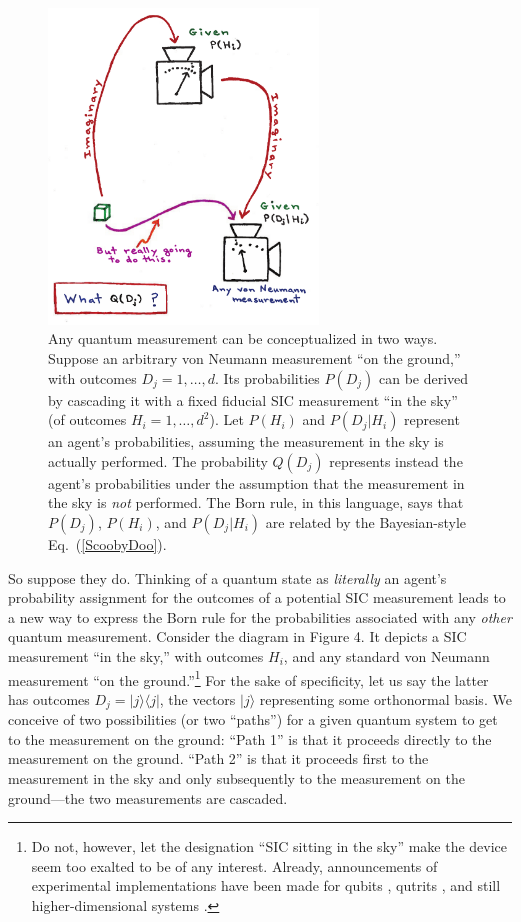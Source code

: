 \documentclass[aps,pra,superscriptaddress,10pt,tightenlines,twocolumn,nofootinbib]{revtex4}
\begin{document}
\begin{figure}
\begin{center}
\includegraphics[height=3.3in]{diagram-new}
\bigskip\caption{ Any quantum measurement can be conceptualized in two ways.
Suppose an arbitrary von Neumann measurement ``on the ground,'' with outcomes $D_j=1,\ldots,d$. Its probabilities $P(D_j)$ can be derived by cascading it with a fixed fiducial SIC measurement ``in the sky'' (of outcomes $H_i=1,\ldots,d^2$). Let $P(H_i)$ and $P(D_j|H_i)$ represent an agent's probabilities, assuming the measurement in the sky is actually performed. The probability $Q(D_j)$ represents instead the agent's probabilities under the assumption that the measurement in the sky is {\it not\/} performed. The Born rule, in this language, says that $P(D_j)$, $P(H_i)$, and $P(D_j|H_i)$ are related by the Bayesian-style Eq.~(\ref{ScoobyDoo}).}
\end{center}
\end{figure}

So suppose they do.  Thinking of a quantum state as {\it literally\/} an agent's probability assignment for the outcomes of a potential SIC measurement leads to a new way to express the Born rule for the probabilities associated with any {\it other\/} quantum measurement.  Consider the diagram in Figure 4.  It depicts a SIC measurement ``in the sky,'' with outcomes $H_i$, and any standard von Neumann measurement ``on the ground.''\footnote{Do not, however, let the designation ``SIC sitting in the sky'' make the device seem too exalted to be of any interest.  Already, announcements of experimental implementations have been made for qubits \cite{Ling06}, qutrits \cite{Medendorp10}, and still higher-dimensional systems \cite{BoydLeuchs}.}  For the sake of specificity, let us say the latter has outcomes $D_j=|j\rangle\langle j|$, the vectors $|j\rangle$ representing some orthonormal basis.  We conceive of two possibilities (or two ``paths'') for a given quantum system to get to the measurement on the ground:  ``Path 1'' is that it proceeds directly to the measurement on the ground.  ``Path 2'' is that it proceeds first to the measurement in the sky and only subsequently to the measurement on the ground---the two measurements are cascaded.
\end{document}
